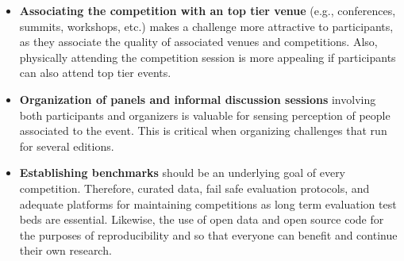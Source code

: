 \documentclass[twoside,11pt]{article}
\begin{document}
\begin{itemize}
    \item \textbf{Associating the competition with an top tier venue} (e.g., conferences, summits, workshops, etc.) makes a challenge more attractive to participants,  as they associate the quality of associated venues and competitions. Also, physically attending the competition session is more appealing if participants can also attend top tier events. 
    
    \item \textbf{Organization of panels and informal discussion sessions} involving both participants and organizers is valuable for sensing perception of people associated to the event. This is critical when organizing challenges that run for several editions. 
    
    \item \textbf{Establishing benchmarks} should be an underlying goal of every competition. Therefore, curated data, fail safe evaluation protocols, and adequate platforms for maintaining competitions as long term evaluation test beds are essential. Likewise,  the use of open data and open source code for the purposes of  reproducibility and so that everyone can benefit and continue their own research.
    

\end{itemize}


\end{document}
